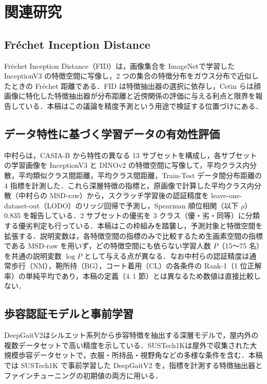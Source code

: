 \documentclass[technicalreport]{ieicej}
\begin{document}
\section{関連研究}
\subsection{Fr\'echet Inception Distance}
Fr\'echet Inception Distance（FID）\cite{Heusel_FID}は，画像集合を ImageNet\cite{Russakovsky_ImageNet}で学習した InceptionV3 の特徴空間に写像し，2 つの集合の特徴分布をガウス分布で近似したときの Fr\'echet 距離である．FID は特徴抽出器の選択に依存し，Cetin ら\cite{Cetin_FacialFD}は顔画像に特化した特徴抽出器が分布距離と近傍関係の評価に与える利点と限界を報告している．本稿はこの議論を精度予測という用途で検証する位置づけにある．

\subsection{データ特性に基づく学習データの有効性評価}
中村ら\cite{Nakamura_IEICE}は，CASIA-B から特性の異なる 13 サブセットを構成し，各サブセットの学習画像を InceptionV3 と DINOv2 の特徴空間に写像して，平均クラス内分散，平均類似クラス間距離，平均クラス間距離，Train-Test データ間分布距離の 4 指標を計測した．これら深層特徴の指標と，原画像で計算した平均クラス内分散（中村らの MSD-raw）から，スクラッチ学習後の認証精度を leave-one-dataset-out（LODO）のリッジ回帰で予測し，Spearman 順位相関（以下 $\rho$）0.835 を報告している．2 サブセットの優劣を 3 クラス（優・劣・同等）に分類する優劣判定も行っている．本稿はこの枠組みを踏襲し，予測対象と特徴空間を拡張する．説明変数は，各特徴空間の指標のみで比較するため生画素空間の指標である MSD-raw を用いず，どの特徴空間にも依らない学習人数 $P$（15〜75 名）を共通の説明変数 $\log P$ として与える点が異なる．なお中村らの認証精度は通常歩行（NM），鞄所持（BG），コート着用（CL）の各条件の Rank-1（1 位正解率）の単純平均であり，本稿の定義（4.\,1 節）とは異なるため数値は直接比較しない．

\subsection{歩容認証モデルと事前学習}
DeepGaitV2\cite{Fan_DeepGaitV2}はシルエット系列から歩容特徴を抽出する深層モデルで，屋内外の複数データセットで高い精度を示している．SUSTech1K\cite{Shen_LidarGait}は屋外で収集された大規模歩容データセットで，衣服・所持品・視野角などの多様な条件を含む．本稿では SUSTech1K で事前学習した DeepGaitV2 を，指標を計測する特徴抽出器とファインチューニングの初期値の両方に用いる．
\end{document}
